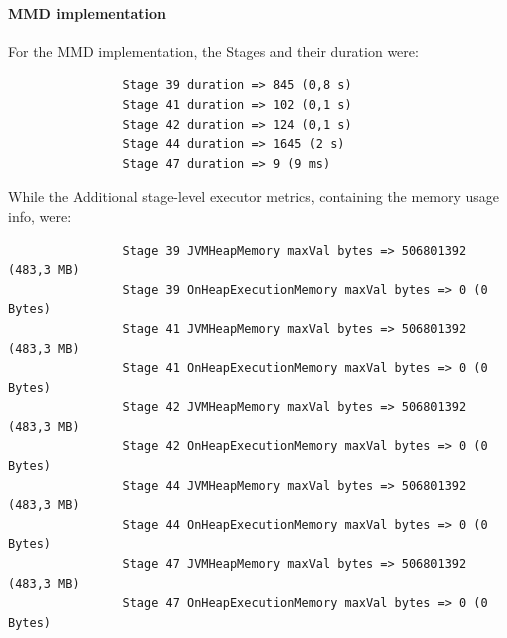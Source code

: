 \documentclass[a4paper,11pt, twoside]{article}
\begin{document}
            \paragraph{MMD implementation}
            For the MMD implementation, the Stages and their duration were:
            \begin{verbatim}
                Stage 39 duration => 845 (0,8 s)
                Stage 41 duration => 102 (0,1 s)
                Stage 42 duration => 124 (0,1 s)
                Stage 44 duration => 1645 (2 s)
                Stage 47 duration => 9 (9 ms)
            \end{verbatim}
            \bigskip
            While the Additional stage-level executor metrics, containing the memory usage info, were:
            \begin{verbatim}
                Stage 39 JVMHeapMemory maxVal bytes => 506801392 (483,3 MB)
                Stage 39 OnHeapExecutionMemory maxVal bytes => 0 (0 Bytes)
                Stage 41 JVMHeapMemory maxVal bytes => 506801392 (483,3 MB)
                Stage 41 OnHeapExecutionMemory maxVal bytes => 0 (0 Bytes)
                Stage 42 JVMHeapMemory maxVal bytes => 506801392 (483,3 MB)
                Stage 42 OnHeapExecutionMemory maxVal bytes => 0 (0 Bytes)
                Stage 44 JVMHeapMemory maxVal bytes => 506801392 (483,3 MB)
                Stage 44 OnHeapExecutionMemory maxVal bytes => 0 (0 Bytes)
                Stage 47 JVMHeapMemory maxVal bytes => 506801392 (483,3 MB)
                Stage 47 OnHeapExecutionMemory maxVal bytes => 0 (0 Bytes)
            \end{verbatim}
    
\end{document}
